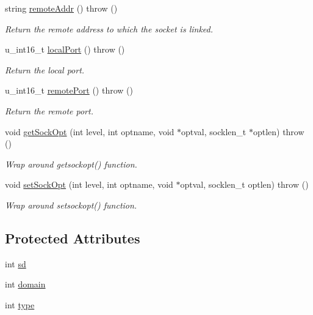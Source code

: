 \begin{CompactItemize}
string \hyperlink{classSocket_242310b19dfd0a252d3bf106512bd569}{remoteAddr} ()  throw ()
\begin{CompactList}\small\item\em Return the remote address to which the socket is linked. \item\end{CompactList}\item 
u\_\-int16\_\-t \hyperlink{classSocket_ca6ab90fa2a1098a143cc59bb4841d80}{localPort} ()  throw ()
\begin{CompactList}\small\item\em Return the local port. \item\end{CompactList}\item 
u\_\-int16\_\-t \hyperlink{classSocket_7cb1ce737346cbc92f7d1cc3d9578d38}{remotePort} ()  throw ()
\begin{CompactList}\small\item\em Return the remote port. \item\end{CompactList}\item 
void \hyperlink{classSocket_25b831123a5914c6203c72cb8a48026b}{getSockOpt} (int level, int optname, void $\ast$optval, socklen\_\-t $\ast$optlen)  throw ()
\begin{CompactList}\small\item\em Wrap around getsockopt() function. \item\end{CompactList}\item 
void \hyperlink{classSocket_5930d6cd7bc34b6de1126b80aad7bedd}{setSockOpt} (int level, int optname, void $\ast$optval, socklen\_\-t optlen)  throw ()
\begin{CompactList}\small\item\em Wrap around setsockopt() function. \item\end{CompactList}\end{CompactItemize}
\subsection*{Protected Attributes}
\begin{CompactItemize}
\item 
int \hyperlink{classSocket_d9e40b6c9a69e0168c27962cc6c60ef7}{sd}
\item 
int \hyperlink{classSocket_8b042d9fe02795041a5e045604c8b7ec}{domain}
\item 
int \hyperlink{classSocket_c7f6980f36023df2004271c336217cb8}{type}
\end{CompactItemize}


